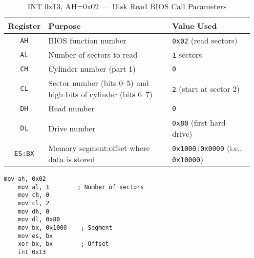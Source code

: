 \begin{table}[h]
    \centering
    \begin{tabular}{|c|p{5cm}|p{4cm}|}
    \hline
    \textbf{Register} & \textbf{Purpose} & \textbf{Value Used} \\ \hline
    \texttt{AH} & BIOS function number & \texttt{0x02} (read sectors) \\ \hline
    \texttt{AL} & Number of sectors to read & \texttt{1} sectors \\ \hline
    \texttt{CH} & Cylinder number (part 1) & \texttt{0} \\ \hline
    \texttt{CL} & Sector number (bits 0–5) and high bits of cylinder (bits 6–7) & \texttt{2} (start at sector 2) \\ \hline
    \texttt{DH} & Head number & \texttt{0} \\ \hline
    \texttt{DL} & Drive number & \texttt{0x80} (first hard drive) \\ \hline
    \texttt{ES:BX} & Memory segment:offset where data is stored & \texttt{0x1000:0x0000} (i.e., \texttt{0x10000}) \\ \hline
    \end{tabular}
    \caption{INT 0x13, AH=0x02 — Disk Read BIOS Call Parameters}
    \label{tab:disk_read_params}
\end{table}
    
    

\begin{lstlisting}[caption={Assembly to load the kernel}]
    mov ah, 0x02
    mov al, 1        ; Number of sectors
    mov ch, 0
    mov cl, 2
    mov dh, 0
    mov dl, 0x80
    mov bx, 0x1000    ; Segment
    mov es, bx
    xor bx, bx        ; Offset
    int 0x13
\end{lstlisting}